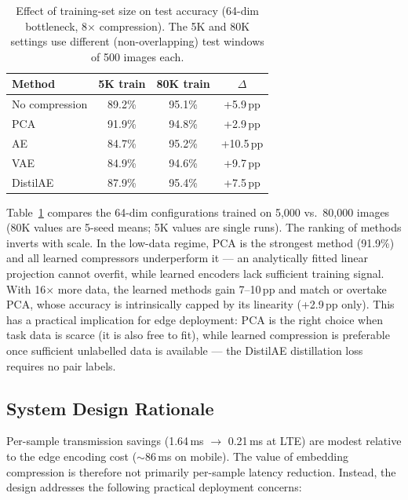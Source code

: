 \begin{table}[h]
\centering
\caption{Effect of training-set size on test accuracy (64-dim bottleneck, 8$\times$ compression). The 5K and 80K settings use different (non-overlapping) test windows of 500 images each.}
\label{tab:datascale}
\begin{tabular}{lccc}
\toprule
\textbf{Method} & \textbf{5K train} & \textbf{80K train} & \textbf{$\Delta$} \\
\midrule
No compression & 89.2\% & 95.1\% & +5.9\,pp \\
PCA            & 91.9\% & 94.8\% & +2.9\,pp \\
AE             & 84.7\% & 95.2\% & +10.5\,pp \\
VAE            & 84.9\% & 94.6\% & +9.7\,pp \\
DistilAE       & 87.9\% & 95.4\% & +7.5\,pp \\
\bottomrule
\end{tabular}
\end{table}

Table~\ref{tab:datascale} compares the 64-dim configurations trained on 5{,}000 vs.\ 80{,}000 images (80K values are 5-seed means; 5K values are single runs). The ranking of methods inverts with scale. In the low-data regime, PCA is the strongest method (91.9\%) and all learned compressors underperform it — an analytically fitted linear projection cannot overfit, while learned encoders lack sufficient training signal. With 16$\times$ more data, the learned methods gain 7--10\,pp and match or overtake PCA, whose accuracy is intrinsically capped by its linearity (+2.9\,pp only). This has a practical implication for edge deployment: PCA is the right choice when task data is scarce (it is also free to fit), while learned compression is preferable once sufficient unlabelled data is available — the DistilAE distillation loss requires no pair labels.

\subsection{System Design Rationale}

Per-sample transmission savings (1.64\,ms $\to$ 0.21\,ms at LTE) are modest relative to the edge encoding cost ($\sim$86\,ms on mobile). The value of embedding compression is therefore not primarily per-sample latency reduction. Instead, the design addresses the following practical deployment concerns:

